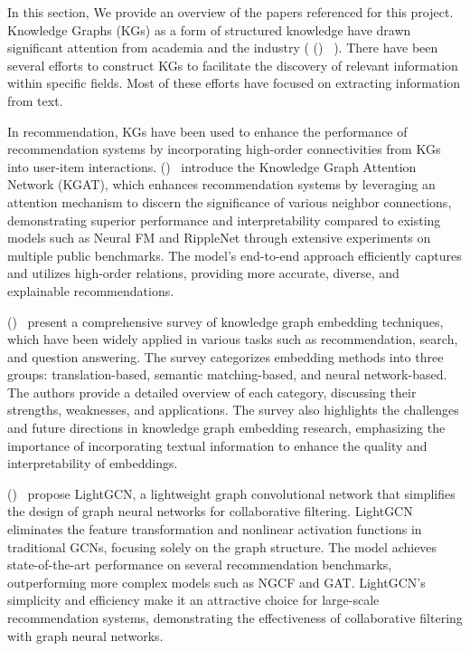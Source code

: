 \documentclass[11pt,a4paper,openany,oneside,titlepage]{article}
\newcommand{\citewithnumber}[1]{%
  \citeauthor{#1} (\citeyear{#1})~\cite{#1}%
}
\begin{document}
In this section, We provide an overview of the papers referenced for this project. Knowledge Graphs (KGs) as a form of structured knowledge have drawn significant attention from academia and the industry (\citewithnumber{ji2022survey}). There have been several efforts to construct KGs to facilitate the discovery of relevant information within specific fields. Most of these efforts have focused on extracting information from text.

In recommendation, KGs have been used to enhance the performance of recommendation systems by incorporating high-order connectivities from KGs into user-item interactions. \citewithnumber {wang2019kgat} introduce the Knowledge Graph Attention Network (KGAT), which enhances recommendation systems by leveraging an attention mechanism to discern the significance of various neighbor connections, demonstrating superior performance and interpretability compared to existing models such as Neural FM and RippleNet through extensive experiments on multiple public benchmarks. The model's end-to-end approach efficiently captures and utilizes high-order relations, providing more accurate, diverse, and explainable recommendations.

\citewithnumber {guo2020survey} present a comprehensive survey of knowledge graph embedding techniques, which have been widely applied in various tasks such as recommendation, search, and question answering. The survey categorizes embedding methods into three groups: translation-based, semantic matching-based, and neural network-based. The authors provide a detailed overview of each category, discussing their strengths, weaknesses, and applications. The survey also highlights the challenges and future directions in knowledge graph embedding research, emphasizing the importance of incorporating textual information to enhance the quality and interpretability of embeddings.

\citewithnumber {he2020lightgcn} propose LightGCN, a lightweight graph convolutional network that simplifies the design of graph neural networks for collaborative filtering. LightGCN eliminates the feature transformation and nonlinear activation functions in traditional GCNs, focusing solely on the graph structure. The model achieves state-of-the-art performance on several recommendation benchmarks, outperforming more complex models such as NGCF and GAT. LightGCN's simplicity and efficiency make it an attractive choice for large-scale recommendation systems, demonstrating the effectiveness of collaborative filtering with graph neural networks.
\end{document}
